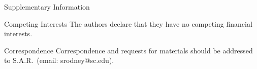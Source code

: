 \documentclass{nature_arxiv}
\begin{document}





% 
% 
% 
% 
% 
% 
% 
% 
% 
% 
% 

% 




{}




\begin{addendum}
 \item[Supplementary Information] 
 \item 
 \item[Competing Interests] The authors declare that they have no
competing financial interests.
 \item[Correspondence] Correspondence and requests for materials
should be addressed to S.A.R.~(email: srodney@sc.edu).
\end{addendum}



\end{document}
